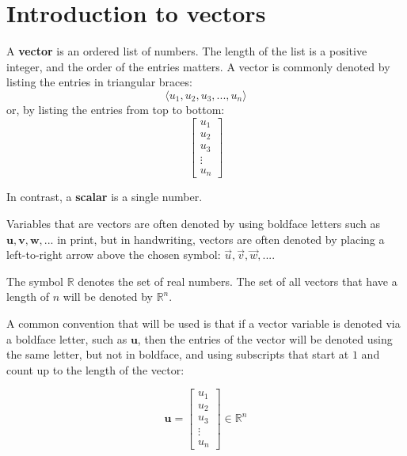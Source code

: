 \documentclass{article}
\begin{document}
\section*{Introduction to vectors}

A {\bf vector} is an ordered list of numbers. The length of the list is a positive integer, and the order of the entries matters. A vector is commonly denoted by listing the entries in triangular braces:
\[\langle u_1, u_2, u_3, ..., u_n \rangle\]
or, by listing the entries from top to bottom:
\[\begin{bmatrix} u_1 \\ u_2 \\ u_3 \\ \vdots \\ u_n \end{bmatrix}\]

In contrast, a {\bf scalar} is a single number.

Variables that are vectors are often denoted by using boldface letters such as \(\mathbf{u}, \mathbf{v}, \mathbf{w}, ...\) in print, but in handwriting, vectors are often denoted by placing a left-to-right arrow above the chosen symbol: \(\vec{u}, \vec{v}, \vec{w}, ...\).


The symbol \(\mathbb{R}\) denotes the set of real numbers. The set of all vectors that have a length of \(n\) will be denoted by \(\mathbb{R}^n\). 

A common convention that will be used is that if a vector variable is denoted via a boldface letter, such as \(\mathbf{u}\), then the entries of the vector will be denoted using the same letter, but not in boldface, and using subscripts that start at \(1\) and count up to the length of the vector:

\[\mathbf{u} = \begin{bmatrix} u_1 \\ u_2 \\ u_3 \\ \vdots \\ u_n \end{bmatrix} \in \mathbb{R}^n\] %
\end{document}
